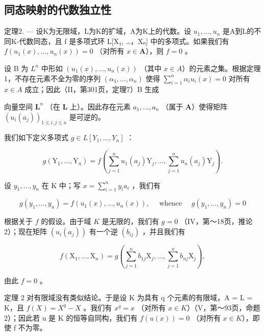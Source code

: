 \subsection{同态映射的代数独立性}

定理2. --- 设K为无限域，L为K的扩域，A为K上的代数。设 \(u_1, \ldots, u_n\) 是A到L的不同K-代数同态，且 f 是多项式环 L{[}X₁, \ldots，Xₙ{]} 中的多项式。如果我们有 \(f(u_1(x), \ldots, u_n(x)) = 0\) （对所有 \(x \in \mathbf{A}\)），则 \(f = 0\) 。

设 B 为 \(L^{n}\) 中形如 \((u_{1}(x), \ldots, u_{n}(x))\) （其中 \(x \in A\)）的元素之集。根据定理 1，不存在元素不全为零的序列 \((\alpha_{1}, \ldots, \alpha_{n})\) 使得 \(\sum_{i=1}^{n} \alpha_{i} u_{i}(x) = 0\) 对所有 \(x \in A\) 成立；因此（II，第301页，定理7）B 生成

向量空间 \(\mathbf{L}^n\) （在 \(\mathbf{L}\) 上）。因此存在元素 \(a_1, \ldots, a_n\) （属于 \(\mathbf{A}\)）使得矩阵 \((u_i(a_j))_{1 \leqslant i, j \leqslant n}\) 是可逆的。

我们如下定义多项式 \(g \in L[Y_1, \ldots, Y_n]\) ：

\[
g \left(\mathrm{Y} _ {1}, \dots , \mathrm{Y} _ {n}\right) = f \left(\sum_ {j = 1} ^ {n} u _ {1} \left(a _ {j}\right) \mathrm{Y} _ {j}, \dots , \sum_ {j = 1} ^ {n} u _ {n} \left(a _ {j}\right) \mathrm{Y} _ {j}\right).\tag{3}
\]

设 \(y_{1}, \ldots, y_{n}\) 在 K 中；写 \(x = \sum_{i=1}^{n} y_{i} a_{i}\) ，我们有

\[
g \left(y _ {1}, \dots , y _ {n}\right) = f \left(u _ {1} (x), \dots , u _ {n} (x)\right), \quad \text { whence } \quad g \left(y _ {1}, \dots , y _ {n}\right) = 0
\]

根据关于 \(f\) 的假设。由于域 \(K\) 是无限的，我们有 \(g = 0\) （IV，第～18页，推论 2）；现在矩阵 \((u_i(a_j))\) 有一个逆 \((b_{ij})\) ，并且我们有

\[
f \left(\mathrm{X} _ {1}, \dots , \mathrm{X} _ {n}\right) = g \left(\sum_ {j = 1} ^ {n} b _ {1 j} \mathrm{X} _ {j}, \dots , \sum_ {j = 1} ^ {n} b _ {n j} \mathrm{X} _ {j}\right),\tag{4}
\]

由此 \(f = 0\) 。

定理 2 对有限域没有类似结论。于是设 K 为具有 q 个元素的有限域，A = L = K，且 \(f(X) = X^{q} - X\) 。我们有 \(x^{q} = x\) （对所有 \(x \in K\)）（V，第～93页，命题 2）；因此若 u 是 K 的恒等自同构，我们有 \(f(u(x)) = 0\) （对所有 \(x \in K\)），即使 f 不为零。

